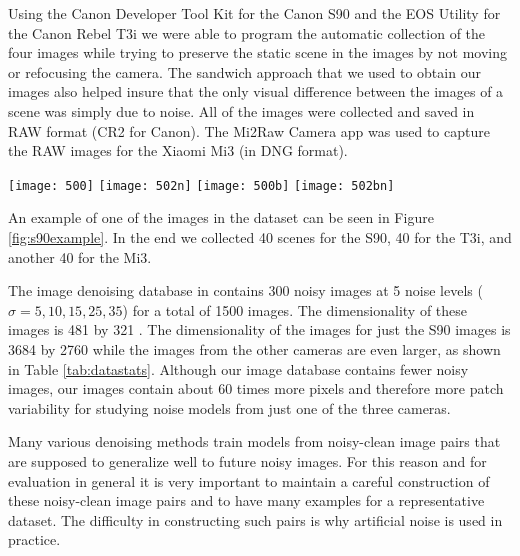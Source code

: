 \documentclass[review]{elsarticle}
\begin{document}
Using the Canon Developer Tool Kit for the Canon S90 and the EOS Utility for the Canon Rebel T3i we were able to program the automatic collection of the four images while trying to preserve the static scene in the images by not moving or refocusing the camera.  The sandwich approach that we used to obtain our images also helped insure that the only visual difference between the images of a scene was simply due to noise.  All of the images were collected and saved in RAW format (CR2 for Canon). The Mi2Raw Camera app was used to capture the RAW images for the Xiaomi Mi3 (in DNG format).
\begin{figure*}[htb]
\centering
\texttt{[image: 500]}
\texttt{[image: 502n]}
\vskip 0.5mm
\texttt{[image: 500b]}
\texttt{[image: 502bn]}
\vskip -3mm
\caption{An example of a clean and noisy image pair as well as their corresponding blue channel. The noise present is the result of the low-light environment. The images were taken using a Canon PowerShot S90. }
\label {fig:s90example}
\vspace{-2mm}
\end{figure*}

An example of one of the images in the dataset can be seen in Figure \ref{fig:s90example}. In the end we collected 40 scenes for the S90, 40 for the T3i, and another 40 for the Mi3.

The image denoising database in \cite{ImageDenoisingBenchmark} contains 300 noisy images at 5 noise levels ($ \sigma =5,10,15,25,35$) for a total of 1500 images. The dimensionality of these images is 481 by 321 . The dimensionality of the images for just the S90 images is 3684 by 2760 while the images from the other cameras are even larger, as shown in Table \ref{tab:datastats}. Although our image database contains fewer noisy images, our images contain about 60 times more pixels and therefore more patch variability for studying noise models from just one of the three cameras.

Many various denoising methods \cite{barbu2009training,NeuralNetworkCompete,optMRF} train models from noisy-clean image pairs that are supposed to generalize well to future noisy images. For this reason and for evaluation in general it is very important to maintain a careful construction of these noisy-clean image pairs and to have many examples for a representative dataset. The difficulty in constructing such pairs is why artificial noise is used in practice.
\end{document}
